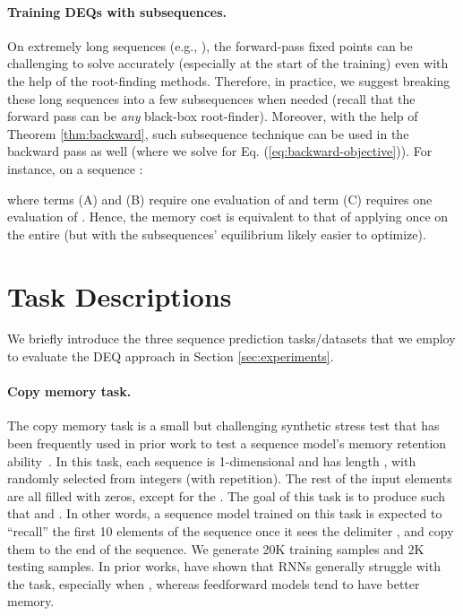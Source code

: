 \documentclass{article}
\begin{document}
\vspace{-2mm}
\paragraph{Training DEQs with subsequences.} On extremely long sequences (e.g., ), the forward-pass fixed points can be challenging to solve accurately (especially at the start of the training) even with the help of the root-finding methods. Therefore, in practice, we suggest breaking these long sequences into a few subsequences when needed (recall that the forward pass can be \emph{any} black-box root-finder). Moreover, with the help of Theorem \ref{thm:backward}, such subsequence technique can be used in the backward pass as well (where we solve for Eq. (\ref{eq:backward-objective})). For instance, on a sequence :

where terms (A) and (B) require one evaluation of  and term (C) requires one evaluation of . Hence, the memory cost is equivalent to that of applying  once on the entire  (but with the subsequences' equilibrium likely easier to optimize).


\section{Task Descriptions}
\label{app:task-descriptions}

We briefly introduce the three sequence prediction tasks/datasets that we employ to evaluate the DEQ approach in Section \ref{sec:experiments}.

\vspace{-2mm}
\paragraph{Copy memory task.} The copy memory task is a small but challenging synthetic stress test that has been frequently used in prior work to test a sequence model's memory retention ability~\citep{Zhang2016NIPS,arjovsky2016unitary,bai2018empirical}. In this task, each sequence  is 1-dimensional and has length , with  randomly selected from integers  (with repetition). The rest of the input elements are all filled with zeros, except for the . The goal of this task is to produce  such that  and . In other words, a sequence model trained on this task is expected to ``recall'' the first 10 elements of the sequence once it sees the delimiter , and copy them to the end of the sequence. We generate 20K training samples and 2K testing samples. In prior works, \cite{bai2018empirical} have shown that RNNs generally struggle with the task, especially when , whereas feedforward models tend to have better memory.
\end{document}
